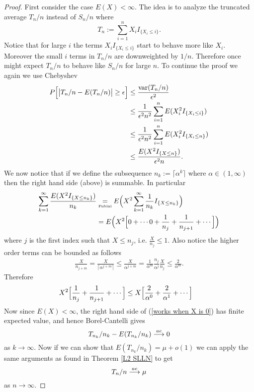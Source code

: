 \begin{proof}
First consider the case $E(X)<\infty$. The idea is to analyze the truncated average $T_n/n$  instead of $S_n/n$ where
\[T_n :=\sum_{i=1}^n X_i I_{\{X_i\leq i\}}. \]
Notice that for large $i$ the terms $X_i I_{\{X_i\leq i\}}$ start to behave more like $X_i$. Moreover the small $i$ terms in $T_n/n$ are downweighted by $1/n$. Therefore once might expect $T_n/n$ to behave like $S_n/n$ for large $n$. To continue the proof we again we use Chebyshev
\begin{align}
\nonumber P\Bigl[\bigl| T_n/n - E(T_n/n)\bigr| \geq \epsilon \Bigr] &\leq \frac{\text{var}(T_n/n)}{\epsilon^2} \\
\nonumber &\leq \frac{1}{\epsilon^2 n^2}\sum_{i=1}^nE(X_i^2 I_{\{X_i\leq i\}}) \\
\nonumber &\leq \frac{1}{\epsilon^2 n^2}\sum_{i=1}^nE(X_i^2 I_{\{X_i\leq n\}}) \\
\label{cheb sum} &\leq \frac{E(X^2 I_{\{X\leq n\}}) }{\epsilon^2 n}.
\end{align}
We now notice that if we define the subsequence $n_k:= \lceil \alpha^k \rceil$ where $\alpha \in (1,\infty)$ then the right hand side (above) is summable. In particular
\begin{align*}
\sum_{k=1}^\infty \frac{E(X^2 I_{\{X\leq n_k\}})}{n_k}
&\underset{\text{\tiny Fubini}} =  E\Bigl(X^2\sum_{k=1}^\infty \frac{1}{n_k}I_{\{X\leq n_k\}}\Bigr) \\
& =  E\Bigl(X^2\Bigl[0+\cdots 0 + \frac{1}{n_j} + \frac{1}{n_{j+1}} +\cdots \Bigr]\Bigr)
\end{align*}
where $j$ is the first index such that $X\leq n_j$, i.e. $\frac{X}{n_j}\leq 1$. Also notice the higher order terms can be bounded as follows
\begin{align*}
\frac{X}{n_{j+m}}  = \frac{X}{\lceil \alpha^{j+m} \rceil}\leq \frac{X}{ \alpha^{j+m} } =  \frac{1}{\alpha^m} \frac{n_j}{\alpha^j} \frac{X}{n_j} \leq   \frac{2}{\alpha^m}.
\end{align*}
Therefore
\begin{align}
\label{works when X is 0}
X^2\Bigl[&\frac{1}{n_j} + \frac{1}{n_{j+1}} +\cdots \Bigr] \leq X\Bigl[ \frac{2}{\alpha^0} +\frac{2}{\alpha^1} +\cdots \Bigr]
\end{align}
Now since $E(X)<\infty$, the right hand side of (\ref{works when X is 0}) has finite expected value, and hence Borel-Cantelli gives
\begin{equation}
\label{SLLN: e1111}
T_{n_k}/n_k - E(T_{n_k}/n_k) \overset{\small ae} \longrightarrow 0
\end{equation}
as $k\rightarrow \infty$.
Now if we can show that $E(T_{n_k}/n_k)  = \mu + o(1)$ we can
apply the same arguments as found in Theorem \ref{L2 SLLN} to get
\begin{equation}
\label{SLLN: e1}
T_{n}/n \overset{\small ae} \longrightarrow \mu
\end{equation}
as $n\rightarrow \infty$.


\end{proof}
